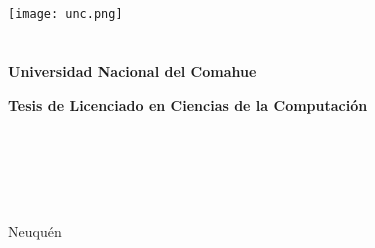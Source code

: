 \documentclass[12pt,spanish]{book}
\begin{document}
\frontmatter

\titlepage

\begin{center}
\ \\
\ \\
\vspace{-1cm}
 
\texttt{[image: unc.png]}\\
\ \\
\ \\
{\Large{\bf \sc Universidad Nacional del Comahue}}\\


\vspace{4cm}

{\Large {\bf\sc Tesis de Licenciado en Ciencias de la Computaci\'on}}\\
\ \\
\ \\
{\LARGE {\bf\titulotesis}}\\ 
\vspace{3.5cm}


{\Large \nombretesista}\\
\vspace{2cm}
\vfill

{\Large {\sc Neuqu\'en}\hspace{6cm}{\sc Argentina}}\\

\end{center}

\vfill
\end{document}
